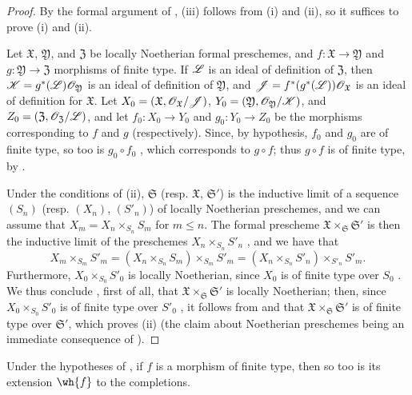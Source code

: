 \begin{proof}
\label{proof-1.10.13.5}
By the formal argument of , (iii) follows from (i) and (ii), so it suffices to prove (i) and (ii).

Let $\mathfrak{X}$, $\mathfrak{Y}$, and $\mathfrak{Z}$ be locally Noetherian formal preschemes, and $f:\mathfrak{X}\to\mathfrak{Y}$ and $g:\mathfrak{Y}\to\mathfrak{Z}$ morphisms of finite type.
If $\mathscr{L}$ is an ideal of definition of $\mathfrak{Z}$, then $\mathscr{K}=g^*(\mathscr{L})\mathscr{O}_\mathfrak{Y}$ is an ideal of definition of $\mathfrak{Y}$, and $\mathscr{J}=f^*(g^*(\mathscr{L}))\mathscr{O}_\mathfrak{X}$ is an ideal of definition for $\mathfrak{X}$.
Let $X_0=(\mathfrak{X},\mathscr{O}_\mathfrak{X}/\mathscr{J})$, $Y_0=(\mathfrak{Y},\mathscr{O}_\mathfrak{Y}/\mathscr{K})$, and $Z_0=(\mathfrak{Z},\mathscr{O}_\mathfrak{Z}/\mathscr{L})$, and let $f_0:X_0\to Y_0$ and $g_0:Y_0\to Z_0$ be the morphisms corresponding to $f$ and $g$ (respectively).
Since, by hypothesis, $f_0$ and $g_0$ are of finite type, so too is $g_0\circ f_0$ , which corresponds to $g\circ f$;
thus $g\circ f$ is of finite type, by .

Under the conditions of (ii), $\mathfrak{S}$ (resp. $\mathfrak{X}$, $\mathfrak{S}'$) is the inductive limit of a sequence $(S_n)$ (resp. $(X_n)$, $(S'_n)$) of locally Noetherian preschemes, and we can assume  that $X_m=X_n\times_{S_n}S_m$ for $m\leq n$.
The formal prescheme $\mathfrak{X}\times_\mathfrak{S}\mathfrak{S}'$ is then the inductive limit of the preschemes $X_n\times_{S_n}S'_n$ , and we have that
\[
    X_m\times_{S_m}S'_m = (X_n\times_{S_n}S_m)\times_{S_m}S'_m = (X_n\times_{S_n}S'_n)\times_{S'_n}S'_m.
\]
Furthermore, $X_0\times_{S_0}S'_0$ is locally Noetherian, since $X_0$ is of finite type over $S_0$ .
We thus conclude , first of all, that $\mathfrak{X}\times_\mathfrak{S}\mathfrak{S}'$ is locally Noetherian;
then, since $X_0\times_{S_0}S'_0$ is of finite type over $S'_0$ , it follows from  and  that $\mathfrak{X}\times_\mathfrak{S}\mathfrak{S}'$ is of finite type over $\mathfrak{S}'$, which proves (ii) (the claim about Noetherian preschemes being an immediate consequence of ).
\end{proof}

\begin{corollary}[10.13.6]
\label{1.10.13.6}
Under the hypotheses of , if $f$ is a morphism of finite type, then so too is its extension $\wh{f}$ to the completions.
\end{corollary}

